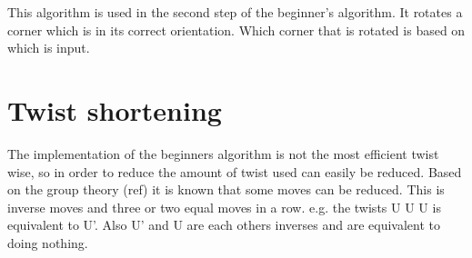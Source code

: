This algorithm is used in the second step of the beginner's algorithm. It rotates a corner \cpiece{} which is in its correct orientation. Which corner that is rotated is based on which is input. 









\section{Twist shortening}
The implementation of the beginners algorithm is not the most efficient twist wise, so in order to reduce the amount of twist used can easily be reduced. Based on the group theory (ref) it is known that some moves can be reduced. This is inverse moves and  three or two equal moves  in a row. e.g.  the twists U U U is equivalent to U'. Also U' and U are each others inverses and are equivalent to doing nothing. 